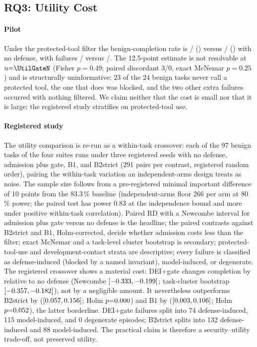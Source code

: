 \documentclass[conference,compsoc]{IEEEtran}
\theoremstyle{definition}
\theoremstyle{plain}
\begin{document}
\subsection{RQ3: Utility Cost}
\label{sec:rq3}
\paragraph*{Pilot}
Under the protected-tool filter the benign-completion rate is
\UtilGatePass/\UtilGateN{} (\UtilGateRate) versus \UtilNdPass/\UtilNdN{}
(\UtilNdRate) with no defense, with failures \UtilGateBlock/\UtilGateN{}
versus \UtilNdBlock/\UtilNdN. The 12.5-point estimate is not resolvable
at $n{=}\UtilGateN$ (Fisher $p{=}0.49$; paired discordant 3/0, exact
McNemar $p{=}0.25$) and is structurally uninformative: 23 of the 24
benign tasks never call a protected tool, the one that does was
blocked, and the two other extra failures occurred with nothing
filtered. We claim neither that the cost is small nor that it is
large; the registered study stratifies on protected-tool use.

\paragraph*{Registered study}
The utility comparison is re-run as a within-task crossover: each of
the 97 benign tasks of the four suites runs under three registered
seeds with no defense, admission plus gate, B1, and B2strict (291 pairs
per contrast, registered random order), pairing the within-task
variation an independent-arms design treats as noise. The sample size
follows from a pre-registered minimal important difference of 10 points
from the 83.3\,\% baseline (independent-arms floor 266 per arm at
80\,\% power; the paired test has power 0.83 at the independence bound
and more under positive within-task correlation). Paired RD with a
Newcombe interval for admission plus gate versus no defense is the
headline; the paired contrasts against B2strict and B1, Holm-corrected,
decide whether admission costs less than the filter; exact McNemar and
a task-level cluster bootstrap is secondary; protected-tool-use and
development-contact strata are descriptive; every failure is classified
as defense-induced (blocked by a named invariant), model-induced, or
degenerate.
The registered crossover shows a material cost: DEI+gate changes
completion by \RqThreeUtilDeiGatePairedRD{} relative to no defense
(Newcombe $[-0.333,-0.199]$;
task-cluster bootstrap $[-0.357,-0.182]$),
not by a negligible amount. It nevertheless outperforms B2strict by
\RqThreeUtilDeiGateVsBTwoStrictPairedRD{}
($[0.057,0.156]$;
Holm $p{=}0.000$) and B1 by
\RqThreeUtilDeiGateVsBOnePairedRD{}
($[0.003,0.106]$;
Holm $p{=}0.052$), the latter borderline.
DEI+gate failures split into 74 defense-induced, 115 model-induced, and
0 degenerate episodes; B2strict splits into 132 defense-induced and 88
model-induced. The practical claim is therefore a security--utility
trade-off, not preserved utility.
\end{document}
